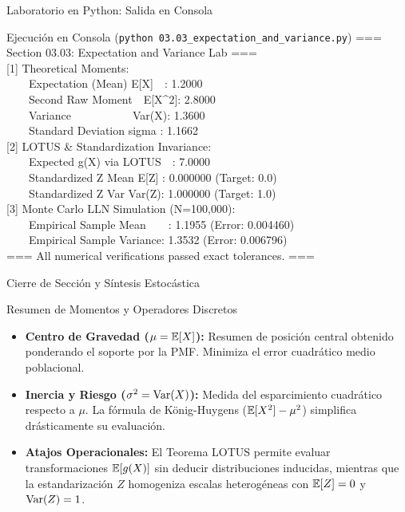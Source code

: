 \documentclass[10pt, aspectratio=169]{beamer}
\begin{document}
\begin{frame}[fragile]{Laboratorio en Python: Salida en Consola}
  \begin{block}{Ejecución en Consola (\texttt{python 03.03\_expectation\_and\_variance.py})}
    \fontsize{6.5pt}{7.5pt}\selectfont\ttfamily
=== Section 03.03: Expectation and Variance Lab ===\\[0.1cm]
{[1]} Theoretical Moments:\\
\ \ \ \ Expectation (Mean) E[X]\ \ : 1.2000\\
\ \ \ \ Second Raw Moment\ \ E[X\^{}2]: 2.8000\\
\ \ \ \ Variance\ \ \ \ \ \ \ \ \ \ \ Var(X): 1.3600\\
\ \ \ \ Standard Deviation sigma : 1.1662\\[0.1cm]
{[2]} LOTUS \& Standardization Invariance:\\
\ \ \ \ Expected g(X) via LOTUS\ \ : 7.0000\\
\ \ \ \ Standardized Z Mean E[Z] : 0.000000 (Target: 0.0)\\
\ \ \ \ Standardized Z Var Var(Z): 1.000000 (Target: 1.0)\\[0.1cm]
{[3]} Monte Carlo LLN Simulation (N=100,000):\\
\ \ \ \ Empirical Sample Mean\ \ \ \ : 1.1955 (Error: 0.004460)\\
\ \ \ \ Empirical Sample Variance: 1.3532 (Error: 0.006796)\\[0.1cm]
=== All numerical verifications passed exact tolerances. ===
  \end{block}
\end{frame}






\begin{frame}{Cierre de Sección y Síntesis Estocástica}
  \begin{block}{Resumen de Momentos y Operadores Discretos}
    \footnotesize
    \begin{itemize}\itemsep=0.1cm
      \item \textbf{Centro de Gravedad ($\mu = \mathbb{E}[X]$):} Resumen de posición central obtenido ponderando el soporte por la PMF. Minimiza el error cuadrático medio poblacional.
      \item \textbf{Inercia y Riesgo ($\sigma^2 = \operatorname{Var}(X)$):} Medida del esparcimiento cuadrático respecto a $\mu$. La fórmula de König-Huygens ($\mathbb{E}[X^2] - \mu^2$) simplifica drásticamente su evaluación.
      \item \textbf{Atajos Operacionales:} El Teorema LOTUS permite evaluar transformaciones $\mathbb{E}[g(X)]$ sin deducir distribuciones inducidas, mientras que la estandarización $Z$ homogeniza escalas heterogéneas con $\mathbb{E}[Z]=0$ y $\operatorname{Var}(Z)=1$.
    \end{itemize}
  \end{block}
\end{frame}
\end{document}
